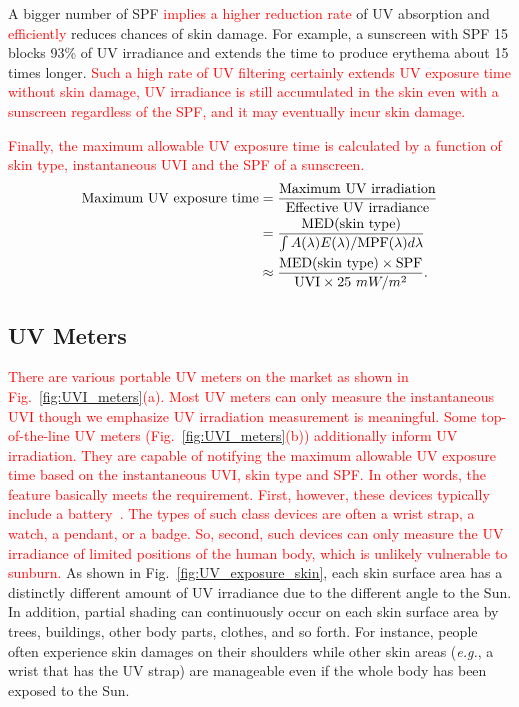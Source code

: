 \documentclass[journal]{IEEEtran}
\begin{document}
A bigger number of SPF \textcolor{red}{implies a higher reduction rate} of UV absorption and \textcolor{red}{efficiently} reduces chances of skin damage. For example, a sunscreen with SPF 15 blocks 93\% of UV irradiance and extends the time to produce erythema about 15 times longer. \textcolor{red}{Such a high rate of UV filtering certainly extends UV exposure time without skin damage, UV irradiance is still accumulated in the skin even with a sunscreen regardless of the SPF, and it may eventually incur skin damage.}

\textcolor{red}{Finally, the maximum allowable UV exposure time is calculated by a function of skin type, instantaneous UVI and the SPF of a sunscreen.} 
\begin{equation} \label{eq: max_exp_time}
\begin{split}
\text{\rm Maximum~UV~exposure~time}
&= \frac{\rm Maximum~UV~irradiation}{\rm Effective~UV~irradiance} \\
&= \frac{\text{MED}(\text{skin~type})}{\int A(\lambda)E(\lambda)  / \text{MPF}(\lambda) d \lambda} \\
&\approx \frac{\text{MED}(\text{skin~type})\times \text{SPF}}{\text{UVI} \times 25~mW/m^2}.
\end{split}
\end{equation}


\subsection{UV Meters}
\textcolor{red}{There are various portable UV meters on the market as shown in Fig.~\ref{fig:UVI_meters}(a). Most UV meters can only measure the instantaneous UVI though we emphasize UV irradiation measurement is meaningful. Some top-of-the-line UV meters (Fig.~\ref{fig:UVI_meters}(b)) additionally inform UV irradiation. They are capable of notifying the maximum allowable UV exposure time based on the instantaneous UVI, skin type and SPF. In other words, the feature basically meets the requirement.  First, however, these devices typically include a battery~\cite{Netatmo, Ultra}. The types of such class devices are often a wrist strap, a watch, a pendant, or a badge. So, second, such devices can only measure the UV irradiance of limited positions of the human body, which is unlikely vulnerable to sunburn.} 
%
As shown in Fig.~\ref{fig:UV_exposure_skin}, each skin surface area has a distinctly different amount of UV irradiance due to the different angle to the Sun. In addition, partial shading can continuously occur on each skin surface area by trees, buildings, other body parts, clothes, and so forth. For instance, people often experience skin damages on their shoulders while other skin areas (\textit{e.g.}, a wrist that has the UV strap) are manageable even if the whole body has been exposed to the Sun.
\end{document}

